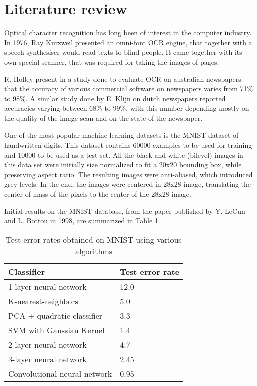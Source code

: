 \section{Literature review}
Optical character recognition has long been of interest in the computer industry. In 1976, Ray Kurzweil presented an omni-font OCR engine, that together with a speech synthesiser would read texts to blind people. It came together with its own special scanner, that was required for taking the images of pages. \cite{schantz1982history}

R. Holley present in a study\cite{Holley_2009} done to evaluate OCR on australian newspapers that the accuracy of various commercial software on newspapers varies from 71\% to 98\%. A similar study done by E. Klijn on dutch newspapers reported accuracies varying between 68\% to 99\%, with this number depending mostly on the quality of the image scan and on the state of the newspaper. 

One of the most popular machine learning datasets is the MNIST dataset of handwritten digits\cite{lecun1998mnist}. This dataset contains 60000 examples to be used for training and 10000 to be used as a test set. All the black and white (bilevel) images in this data set were initially size normalized to fit a 20x20 bounding box, while preserving aspect ratio. The resulting images were anti-aliased, which introduced grey levels. In the end, the images were centered in 28x28 image, translating the center of mass of the pixels to the center of the 28x28 image. 

Initial results on the MNIST database, from the paper published by Y. LeCun and L. Bottou in 1998\cite{Lecun_1998}, are summarized in Table \ref{table:mnist_results}. 

\begin{table}[h]
\caption{Test error rates obtained on MNIST using various algorithms}
\label{table:mnist_results}
\begin{tabular}{ll}
\hline
Classifier                   & Test error rate \\ \hline
1-layer neural network       & 12.0            \\
K-nearest-neighbors          & 5.0             \\
PCA + quadratic classifier   & 3.3             \\
SVM with Gaussian Kernel     & 1.4             \\
2-layer neural network       & 4.7             \\
3-layer neural network       & 2.45            \\
Convolutional neural network & 0.95            \\ \hline
\end{tabular}
\end{table}

